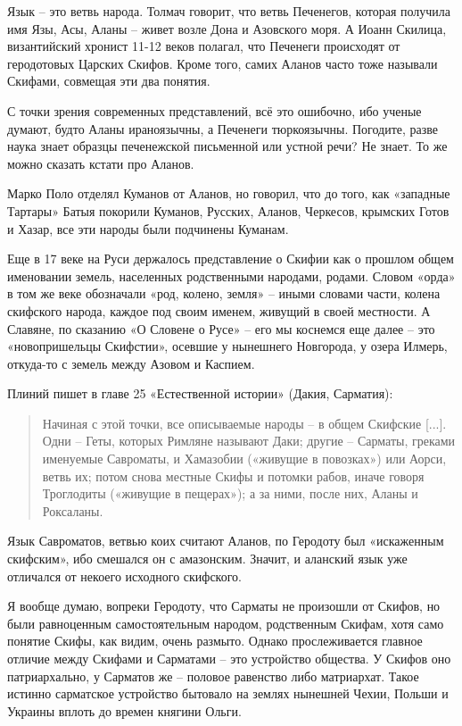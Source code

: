 Язык – это ветвь народа. Толмач говорит, что ветвь Печенегов, которая получила имя Язы, Асы, Аланы – живет возле Дона и Азовского моря. А Иоанн Скилица, византийский хронист 11-12 веков полагал, что Печенеги происходят от геродотовых Царских Скифов. Кроме того, самих Аланов часто тоже называли Скифами, совмещая эти два понятия.

С точки зрения современных представлений, всё это ошибочно, ибо ученые думают, будто Аланы ираноязычны, а Печенеги тюркоязычны. Погодите, разве наука знает образцы печенежской письменной или устной речи? Не знает. То же можно сказать кстати про Аланов.

Марко Поло отделял Куманов от Аланов, но говорил, что до того, как «западные Тартары» Батыя покорили Куманов, Русских, Аланов, Черкесов, крымских Готов и Хазар, все эти народы были подчинены Куманам. 

Еще в 17 веке на Руси держалось представление о Скифии как о прошлом общем именовании земель, населенных родственными народами, родами. Словом «орда» в том же веке обозначали «род, колено, земля» – иными словами части, колена скифского народа, каждое под своим именем, живущий в своей местности. А Славяне, по сказанию «О Словене о Русе» – его мы коснемся еще далее – это «новопришельцы Скифстии», осевшие у нынешнего Новгорода, у озера Илмерь, откуда-то с земель между Азовом и Каспием.

Плиний пишет в главе 25 «Естественной истории» (Дакия, Сарматия): 

\begin{quotation}
Начиная с этой точки, все описываемые народы – в общем Скифские [...]. Одни – Геты, которых Римляне называют Даки; другие – Сарматы, греками именуемые Савроматы, и Хамазобии («живущие в повозках») или Аорси, ветвь их; потом снова местные Скифы и потомки рабов, иначе говоря Троглодиты («живущие в пещерах»); а за ними, после них, Аланы и Роксаланы.
\end{quotation}

Язык Савроматов, ветвью коих считают Аланов, по Геродоту был «искаженным скифским», ибо смешался он с амазонским. Значит, и аланский язык уже отличался от некоего исходного скифского. 

Я вообще думаю, вопреки Геродоту, что Сарматы не произошли от Скифов, но были равноценным самостоятельным народом, родственным Скифам, хотя само понятие Скифы, как видим, очень размыто. Однако прослеживается главное отличие между Скифами и Сарматами – это устройство общества. У Скифов оно патриархально, у Сарматов же – половое равенство либо матриархат. Такое истинно сарматское устройство бытовало на землях нынешней Чехии, Польши и Украины вплоть до времен княгини Ольги.


